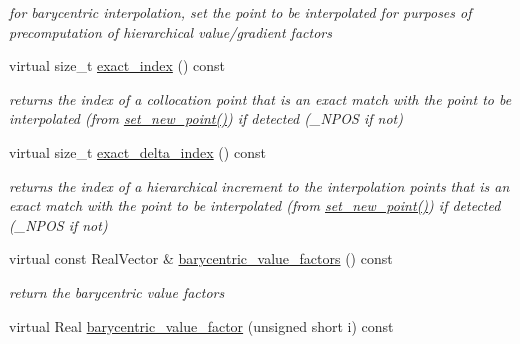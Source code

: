 \begin{DoxyCompactItemize}
\begin{DoxyCompactList}\small\item\em for barycentric interpolation, set the point to be interpolated for purposes of precomputation of hierarchical value/gradient factors \end{DoxyCompactList}\item 
virtual size\+\_\+t \hyperlink{classPecos_1_1BasisPolynomial_aed1b9a98e9f80287b21581e7278aa253}{exact\+\_\+index} () const \label{classPecos_1_1BasisPolynomial_aed1b9a98e9f80287b21581e7278aa253}

\begin{DoxyCompactList}\small\item\em returns the index of a collocation point that is an exact match with the point to be interpolated (from \hyperlink{classPecos_1_1BasisPolynomial_afdf46109d433281e37d3de26f4bd1b3d}{set\+\_\+new\+\_\+point()}) if detected (\+\_\+\+N\+P\+OS if not) \end{DoxyCompactList}\item 
virtual size\+\_\+t \hyperlink{classPecos_1_1BasisPolynomial_a90937bbedd0d5c002f5015cf3847cbaf}{exact\+\_\+delta\+\_\+index} () const \label{classPecos_1_1BasisPolynomial_a90937bbedd0d5c002f5015cf3847cbaf}

\begin{DoxyCompactList}\small\item\em returns the index of a hierarchical increment to the interpolation points that is an exact match with the point to be interpolated (from \hyperlink{classPecos_1_1BasisPolynomial_afdf46109d433281e37d3de26f4bd1b3d}{set\+\_\+new\+\_\+point()}) if detected (\+\_\+\+N\+P\+OS if not) \end{DoxyCompactList}\item 
virtual const Real\+Vector \& \hyperlink{classPecos_1_1BasisPolynomial_ab95f72f936b15b2f4cecde96d34d798c}{barycentric\+\_\+value\+\_\+factors} () const \label{classPecos_1_1BasisPolynomial_ab95f72f936b15b2f4cecde96d34d798c}

\begin{DoxyCompactList}\small\item\em return the barycentric value factors \end{DoxyCompactList}\item 
virtual Real \hyperlink{classPecos_1_1BasisPolynomial_a72c4d54d2ef767ab8329f1fb67c7a3fe}{barycentric\+\_\+value\+\_\+factor} (unsigned short i) const \label{classPecos_1_1BasisPolynomial_a72c4d54d2ef767ab8329f1fb67c7a3fe}


\end{DoxyCompactItemize}
